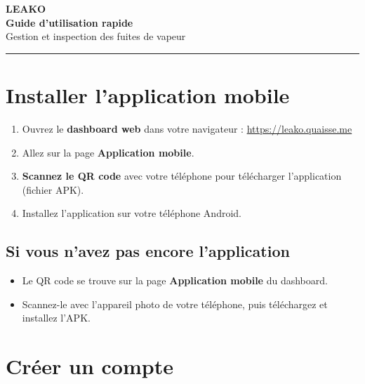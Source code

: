 \documentclass[11pt,a4paper]{article}
\begin{document}
\begin{center}
{\Huge\bfseries\textcolor{ocpvertfonce}{LEAKO}}\\[0.3cm]
{\Large\bfseries Guide d'utilisation rapide}\\[0.2cm]
{\large Gestion et inspection des fuites de vapeur}\\[0.5cm]
\rule{0.5\textwidth}{1pt}
\end{center}

\vspace{0.5cm}

\section{Installer l'application mobile}

\begin{enumerate}[leftmargin=2em]
    \item Ouvrez le \textbf{dashboard web} dans votre navigateur : \url{https://leako.quaisse.me}
    \item Allez sur la page \textbf{Application mobile}.
    \item \textbf{Scannez le QR code} avec votre téléphone pour télécharger l'application (fichier APK).
    \item Installez l'application sur votre téléphone Android.
\end{enumerate}

\subsection{Si vous n'avez pas encore l'application}
\begin{itemize}
    \item Le QR code se trouve sur la page \textbf{Application mobile} du dashboard.
    \item Scannez-le avec l'appareil photo de votre téléphone, puis téléchargez et installez l'APK.
\end{itemize}

\section{Créer un compte}
\end{document}

